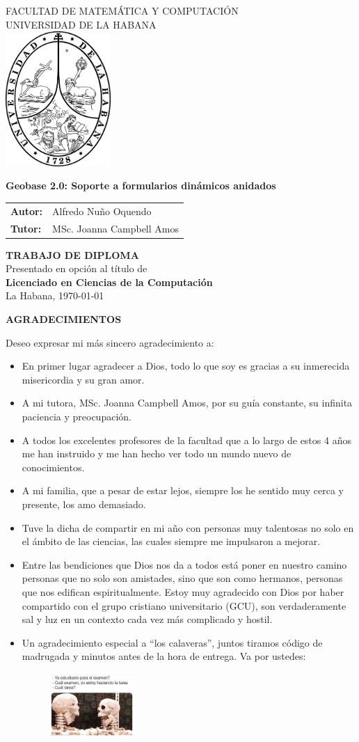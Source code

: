 \documentclass[12pt, a4paper]{book}
\date{}
\newcommand{\portada}[5]{ %
  \begin{titlepage}
    \begin{center}
      {\normalsize FACULTAD DE MATEMÁTICA Y COMPUTACIÓN} \\
      {\normalsize UNIVERSIDAD DE LA HABANA} \\
      \vspace{1cm}
      \includegraphics[width=0.3\textwidth]{images/uhlogo.png} \\
      \vspace{2cm}
      
      {\LARGE \textbf{#1}} \\
      \vspace{2cm}
      
      \begin{tabular}{l l}
        \textbf{Autor:} & #2 \\
        \textbf{Tutor:} & #3 \\
      \end{tabular}
      \vspace{2cm}
      
      \textbf{TRABAJO DE DIPLOMA} \\
      Presentado en opción al título de \\
      \textbf{#4} \\
      \vfill
      #5 %
    \end{center}
  \end{titlepage}
}
\newenvironment{agradecimientos}{
  \clearpage %
  \thispagestyle{empty} %
  \begin{center}
    {\LARGE\bfseries AGRADECIMIENTOS} \\[1.5cm]
  \end{center}
  \setlength{\parindent}{0pt} %
  \setlength{\parskip}{1em} %
}{
  \vspace*{\fill} %
  \newpage %
}
\let\cleardoublepage\clearpage %
\begin{document}
\portada
  {Geobase 2.0: Soporte a formularios dinámicos anidados} %
  {Alfredo Nuño Oquendo}                %
  {MSc. Joanna Campbell Amos}           %
  {Licenciado en Ciencias de la Computación} %
  {La Habana, \today}                       %

\begin{agradecimientos}
  Deseo expresar mi más sincero agradecimiento a:
  
  \begin{itemize}
    \item En primer lugar agradecer a Dios, todo lo que soy es gracias a su inmerecida misericordia y su gran amor.
    \item A mi tutora, MSc. Joanna Campbell Amos, por su guía constante, su infinita paciencia y preocupación.
    \item A todos los excelentes profesores de la facultad que a lo largo de estos 4 años me han instruido y me han hecho ver todo un mundo nuevo de conocimientos.
    \item A mi familia, que a pesar de estar lejos, siempre los he sentido muy cerca y presente, los amo demasiado.
    \item Tuve la dicha de compartir en mi año con personas muy talentosas no solo en el ámbito de las ciencias, las cuales siempre me impulsaron a mejorar. 
    \item Entre las bendiciones que Dios nos da a todos está poner en nuestro camino personas que no solo son amistades, sino que son como hermanos, personas que nos edifican espiritualmente. Estoy muy agradecido con Dios por haber compartido con el grupo cristiano universitario (GCU), son verdaderamente sal y luz en un contexto cada vez más complicado y hostil.
    \item Un agradecimiento especial a ``los calaveras'', juntos tiramos código de madrugada y minutos antes de la hora de entrega. Va por ustedes:
    \begin{figure}[H]
      \centering
      \includegraphics[width=0.3\textwidth]{images/meme-calaveras.jpg}
      \label{fig:skull}
    \end{figure} 

\end{itemize}
\end{agradecimientos}
\end{document}
